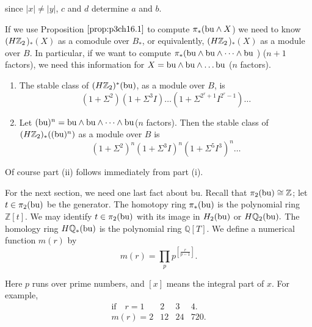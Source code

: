 \documentclass[../main]{subfiles}
\begin{document}
since $|x| \neq |y|$, $c$ and $d$ determine $a$ and $b$.

If we use Proposition $\ref{prop:p3ch16.1}$ to compute $\pi_{\ast}(\mathrm{bu}  \wedge X$) we need to know $(H\mathbb{Z}_2$)$_{\ast}(X)$ as a comodule over $B_{\ast}$, or equivalently, $(H\mathbb{Z}_2$)$_{\ast}(X)$ as a module over $B$. In particular, if we want to compute $\pi_{\ast}(\mathrm{bu} \wedge \mathrm{bu} \wedge\dots \wedge \mathrm{bu}$ ) ($n+1$ factors), we need this information for $X=\mathrm{bu} \wedge \mathrm{bu} \wedge\dots \mathrm{bu} $ ($n$ factors).

\begin{proposition} \label{prop:p3ch16.4}\mbox{} %
\begin{enumerate}
    \item[(i)] The stable class of $(H\mathbb{Z}_2)^{\ast}(\mathrm{bu})$, as a module over $B$, is
    \[ (1+\Sigma^{2})(1+\Sigma^{3}I)\dots(1+\Sigma^{2^{r}+1}I^{2^{r}-1})\dots \]
\item[(ii)] Let $(\mathrm{bu})^{n}=\mathrm{bu}\wedge \mathrm{bu} \wedge\dots \wedge \mathrm{bu}$($n$ factors). Then the stable class
of $(H\mathbb{Z}_2)_{\ast}((\mathrm{bu})^{n})$ as a module over $B$ is \[
    (1+\Sigma^{2})^{n}(1+\Sigma^{3}I)^{n}(1+\Sigma^{5}I^{3})^{n}\dots
\]
\end{enumerate}
Of course part (ii) follows immediately from part (i).
\end{proposition}

For the next section, we need one last fact about bu. Recall that $\pi_{2}(\mathrm{bu})\cong \mathbb{Z}$; let $t\in \pi_{2}(\mathrm{bu})$ be the generator. The homotopy ring  $\pi_{\ast}(\mathrm{bu})$ is the polynomial ring $\mathbb Z[t]$. We may identify $t\in \pi_{2}(\mathrm{bu}) $ with its image in $H_{2}(\mathrm{bu})$ or $H\mathbb{Q}_{2}(\mathrm{bu}).$ The homology ring $H\mathbb{Q}_{\ast}(\mathrm{bu})$ is the polynomial ring $\mathbb Q[T]$. We define a numerical function $m(r)$ by \[
    m(r)= \prod_{p}p^{\left[\frac{r}{p-1}\right]}.
\]

Here $p$ runs over prime numbers, and $[x]$ means the integral part of $x$. For example, 
\[ \begin{matrix}
\text{if}\quad  r=1 & 2 & 3 & 4.\\
m(r)=2 & 12 & 24 & 720.
\end{matrix} \]
    
\end{document}
